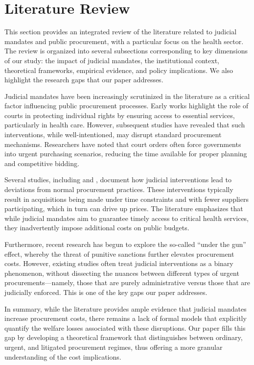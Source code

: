 \section{Literature Review}

This section provides an integrated review of the literature related to judicial mandates and public procurement, with a particular focus on the health sector. The review is organized into several subsections corresponding to key dimensions of our study: the impact of judicial mandates, the institutional context, theoretical frameworks, empirical evidence, and policy implications. We also highlight the research gaps that our paper addresses.

Judicial mandates have been increasingly scrutinized in the literature as a critical factor influencing public procurement processes. Early works highlight the role of courts in protecting individual rights by ensuring access to essential services, particularly in health care. However, subsequent studies have revealed that such interventions, while well-intentioned, may disrupt standard procurement mechanisms. Researchers have noted that court orders often force governments into urgent purchasing scenarios, reducing the time available for proper planning and competitive bidding.

Several studies, including \citet{wang2015right} and \citet{cnj2019judicializacao}, document how judicial interventions lead to deviations from normal procurement practices. These interventions typically result in acquisitions being made under time constraints and with fewer suppliers participating, which in turn can drive up prices. The literature emphasizes that while judicial mandates aim to guarantee timely access to critical health services, they inadvertently impose additional costs on public budgets.

Furthermore, recent research has begun to explore the so-called “under the gun” effect, whereby the threat of punitive sanctions further elevates procurement costs. However, existing studies often treat judicial interventions as a binary phenomenon, without dissecting the nuances between different types of urgent procurements—namely, those that are purely administrative versus those that are judicially enforced. This is one of the key gaps our paper addresses.

In summary, while the literature provides ample evidence that judicial mandates increase procurement costs, there remains a lack of formal models that explicitly quantify the welfare losses associated with these disruptions. Our paper fills this gap by developing a theoretical framework that distinguishes between ordinary, urgent, and litigated procurement regimes, thus offering a more granular understanding of the cost implications.

